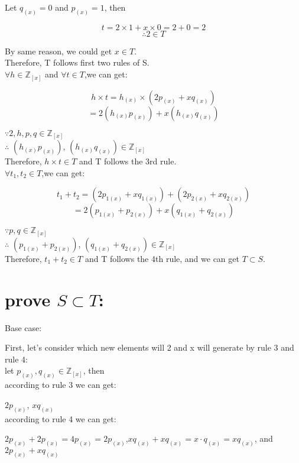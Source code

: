 \documentclass[12pt]{article}
\begin{document}
Let $q_{(x)}=0$ and $p_{(x)}=1$, then

\[t=2\times1+x\times0=2+0=2\]
\[\therefore 2 \in T\]

By same reason, we could get $ x\in T$.\\

Therefore, T follows first two rules of S.\\

$\forall h \in \mathbb{Z}_{[x]}$ and $\forall t \in T$,we can get:

\[ h\times t=
h_{(x)}
\times
(2p_{(x)}+xq_{(x)})\]
\[=2(h_{(x)}p_{(x)})+
x(h_{(x)}q_{(x)})\]


$\because 2,h,p,q\in \mathbb{Z}_{[x]}$\\

$\therefore$
$(h_{(x)}p_{(x)})$, 
$(h_{(x)}q_{(x)})
\in \mathbb{Z}_{[x]}$\\

\noindent
Therefore, $h\times t \in T$ and T follows the 3rd rule.\\

$\forall t_1, t_2 \in T$,we can get:

\[ t_{1}+ t_{2}=
(2p_{1(x)}+xq_{1(x)})
+
(2p_{2(x)}+xq_{2(x)})\]
\[=2(p_{1(x)}+p_{2(x)})+
x(q_{1(x)}+q_{2(x)})\]

$\because p,q\in \mathbb{Z}_{[x]}$\\

$\therefore$
$(p_{1(x)}+p_{2(x)})$, 
$(q_{1(x)}+q_{2(x)})
\in \mathbb{Z}_{[x]}$\\

\noindent
Therefore, $t_{1}+ t_{2} \in T$ and T follows the 4th rule, and we can get ${T} \subset {S}$.


\noindent
\section  {prove ${S} \subset {T}$:}

Base case:\

First, let's consider which new elements will 2 and x will generate by rule 3 and rule 4:\\
let $p_{(x)},q_{(x)} \in \mathbb{Z}_{[x]}$, then\\

according to rule 3 we can get:

$2p_{(x)}$, $xq_{(x)}$\\

according to rule 4 we can get:

$2p_{(x)}+2p_{(x)}=4p_{(x)}=2p_{(x)}$,$xq_{(x)}+xq_{(x)}=x\cdot q_{(x)}=xq_{(x)}$, and $2p_{(x)}+xq_{(x)}$ \\
\end{document}
